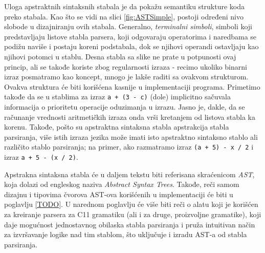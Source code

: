 Uloga apstraktnih sintaksnih stabala je da pokažu semantiku strukture koda preko stabala. Kao što se vidi na slici \ref{fig:ASTSimple}, postoji određeni nivo slobode u dizajniranju ovih stabala. Generalno, \emph{terminalni simboli}, simboli koji predstavljaju listove stabla parsera, koji odgovaraju operatorima i naredbama se podižu naviše i postaju koreni podstabala, dok se njihovi operandi ostavljaju kao njihovi potomci u stablu. Desna stabla sa slike ne prate u potpunosti ovaj princip, ali se takođe koriste zbog regularnosti izraza - recimo ukoliko binarni izraz posmatramo kao koncept, mnogo je lakše raditi sa ovakvom strukturom. Ovakva struktura će biti korišćena kasnije u implementaciji programa. Primetimo takođe da se u stablima za izraz \texttt{a + (3 - c)} (dole) implicitno sačuvala informacija o prioritetu operacije oduzimanja u izrazu. Jasno je, dakle, da se računanje vrednosti aritmetičkih izraza onda vrši kretanjem od listova stabla ka korenu. Takođe, pošto su apstraktna sintaksna stabla apstrakcija stabla parsiranja, više istih izraza jezika može imati isto apstraktno sintaksno stablo ali različito stablo parsiranja; na primer, ako razmatramo izraz \texttt{(a + 5) - x / 2} i izraz \texttt{a + 5 - (x / 2)}.

Apstrakna sintaksna stabla će u daljem tekstu biti referisana skraćenicom \emph{AST}, koja dolazi od engleskog naziva \emph{Abstract Syntax Trees}. Takođe, reči samom dizajnu i tipovima čvorova AST-ova korišćenih u implementaciji će biti u poglavlju \ref{TODO}. U narednom poglavlju će više biti reči o alatu koji je korišćen za kreiranje parsera za C11 gramatiku (ali i za druge, proizvoljne gramatike), koji daje mogućnost jednostavnog obilaska stabla parsiranja i pruža intuitivan način za izvršavanje logike nad tim stablom, što uključuje i izradu AST-a od stabla parsiranja.
